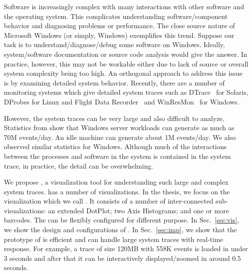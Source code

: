 
Software is increasingly complex with many interactions with other software
and the operating system.
This complicates understanding software/component behavior and diagnosing
problems or performance.
The close source nature of Microsoft Windows (or simply, Windows) exemplifies this trend.
Suppose our task is to understand/diagnose/debug some software on Windows.
Ideally, system/software documentation or source code
analysis would give the answer.
In practice, however, this may not be
workable either due to lack of source or overall
system complexity being too high.
An orthogonal approach to address this issue is by examining
detailed system behavior.
Recently, there are a number of monitoring systems which
give detailed system traces such as DTrace~\cite{cantrill2004dynamic} for Solaris,
DProbes for Linux and Flight Data Recorder~\cite{verbowski6flight}
and WinResMon~\cite{ramnath2006winresmon} for Windows.

However, the system traces can be very large and also
difficult to analyze. Statistics from \cite{verbowski6flight} show that Windows
server workloads can generate as much as 70M events/day.
An idle machine can generate about 1M events/day. We also
observed similar statistics for Windows. Although much of
the interactions between the processes and software in the
system is contained in the system trace, in practice, the detail
can be overwhelming.


We propose \lviz{}, a visualization tool for
understanding such large and complex system traces.
\lviz{} has a number of visualizations.
In the thesis, we focus on the visualization which we call \VDP{}.
It consists of a number of inter-connected sub-visualizations:
an extended DotPlot;
two Axis Histograms; and one or more barcodes.
The \VDP{} can be flexibly configured for different purpose.
In Sec.~\ref{sec:vis}, we show the design and configurations of \VDP{}.
In Sec.~\ref{sec:imp}, we show that
the prototype of \lviz{} is efficient and can handle large system traces
with real-time response. For example, a trace of size 120MB with 558K events 
is loaded in under 3 seconds
and after that it can be interactively displayed/zoomed in around 0.5 seconds.

